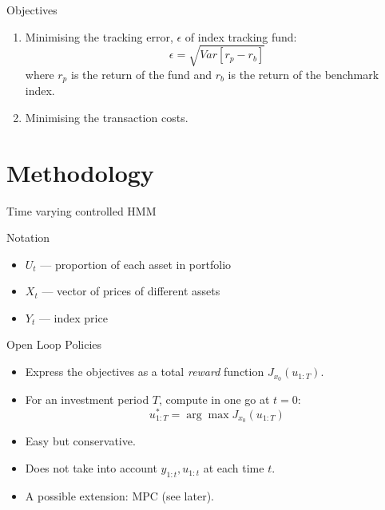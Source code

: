 \documentclass[handout]{beamer}
\begin{document}
\begin{frame}{Objectives}
\begin{enumerate}
\item Minimising the tracking error, $\epsilon$ of index tracking fund:
\begin{equation*}
\epsilon = \sqrt{Var[r_p - r_b]}
\end{equation*}
where $r_p$ is the return of the fund and $r_b$ is the return of the benchmark index.
\item Minimising the transaction costs.
\end{enumerate}
\end{frame}

\section{Methodology}

\begin{frame}{Time varying controlled HMM}
\begin{block}{Notation}
\begin{itemize}
\item $U_t$  --- proportion of each asset in portfolio
\item $X_t$ --- vector of prices of different assets
\item $Y_t$ --- index price
\end{itemize}
\end{block}
\begin{block}{Open Loop Policies}
\begin{itemize}
\item Express the objectives as a total \emph{reward} function $J_{x_0}(u_{1:T})$.
\item For an investment period $T$,  compute in one go at $t=0$:
   \begin{equation*}
      u^*_{1:T} = \arg\max J_{x_0}(u_{1:T})
   \end{equation*}
\item Easy but conservative.
\item Does not take into account $y_{1:t}, u_{1:t}$ at each time $t$.
\item A possible extension: MPC (see later).
\end{itemize}
\end{block}
\end{frame}
\end{document}
